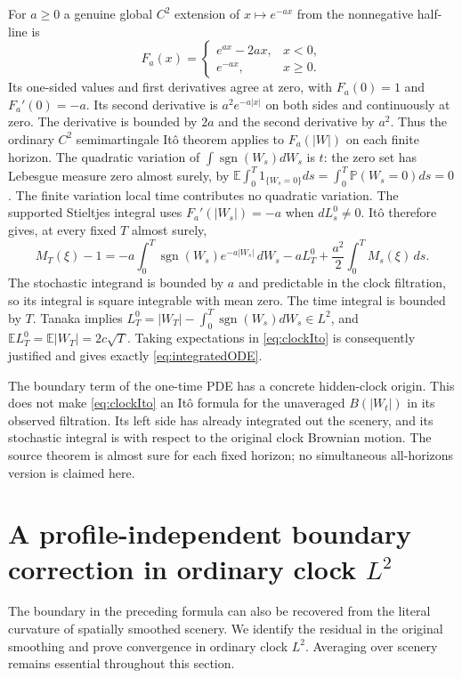 \documentclass[11pt]{article}
\newcommand{\E}{\mathbb E}
\newcommand{\Pp}{\mathbb P}
\begin{document}
For $a\geq0$ a genuine global $C^2$ extension of $x\mapsto e^{-ax}$
from the nonnegative half-line is
\[
 F_a(x)=\begin{cases} e^{ax}-2ax,&x<0,\\e^{-ax},&x\geq0.\end{cases}
\]
Its one-sided values and first derivatives agree at zero, with
$F_a(0)=1$ and $F_a'(0)=-a$. Its second derivative is
$a^2 e^{-a|x|}$ on both sides and continuously at zero.
The derivative is bounded by $2a$ and the second derivative by
$a^2$. Thus the ordinary $C^2$ semimartingale It\^o theorem applies
to $F_a(|W|)$ on each finite horizon. The quadratic variation of
$\int\operatorname{sgn}(W_s)dW_s$ is $t$: the zero set has
Lebesgue measure zero almost surely, by
$\E\int_0^T1_{\{W_s=0\}}ds=\int_0^T\Pp(W_s=0)ds=0$.
The finite variation local time contributes no quadratic variation.
The supported Stieltjes integral uses $F_a'(|W_s|)=-a$ when
$dL_s^0\ne0$. It\^o therefore gives, at every fixed $T$ almost surely,
\begin{equation}\label{eq:clockIto}
 M_T(\xi)-1
 =-a\int_0^T\operatorname{sgn}(W_s)e^{-a|W_s|}\,dW_s
       -aL_T^0+\frac{a^2}{2}\int_0^T M_s(\xi)\,ds.
\end{equation}
The stochastic integrand is bounded by $a$ and predictable in the
clock filtration, so its integral is square integrable with mean zero.
The time integral is bounded by $T$. Tanaka implies
$L_T^0=|W_T|-\int_0^T\operatorname{sgn}(W_s)dW_s\in L^2$,
and $\E L_T^0=\E|W_T|=2c\sqrt T$.
Taking expectations in \eqref{eq:clockIto} is consequently justified
and gives exactly \eqref{eq:integratedODE}.

The boundary term of the one-time PDE has a concrete hidden-clock
origin. This does not make \eqref{eq:clockIto} an It\^o formula for
the unaveraged $B(|W_t|)$ in its observed filtration. Its left side
has already integrated out the scenery, and its stochastic integral
is with respect to the original clock Brownian motion. The source
theorem is almost sure for each fixed horizon; no simultaneous
all-horizons version is claimed here.

\section{A profile-independent boundary correction in ordinary clock $L^2$}
The boundary in the preceding formula can also be recovered from the
literal curvature of spatially smoothed scenery. We identify the
residual in the original smoothing and prove convergence in ordinary
clock $L^2$. Averaging over scenery remains essential throughout
this section.
\end{document}
